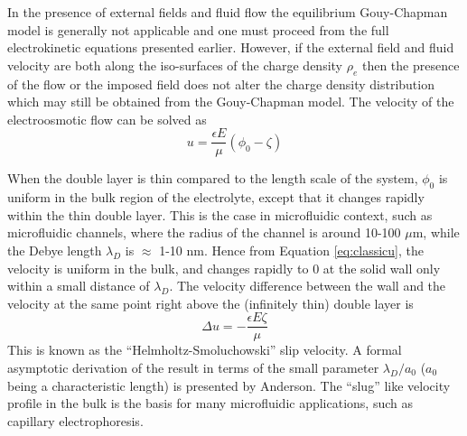 In the presence of external fields and fluid flow the equilibrium Gouy-Chapman model is generally not applicable and one must proceed from the full electrokinetic equations presented earlier. However, if the external field and fluid velocity are both along the iso-surfaces of the charge density $\rho_e$ then the presence of the flow or the imposed field does not alter the charge density distribution which may still be obtained from the Gouy-Chapman model. The velocity of the electroosmotic flow can be solved as
\begin{equation}
u = \frac{\epsilon E}{\mu}\left(\phi_0 - \zeta\right)
\label{eq:classicu}
\end{equation}

When the double layer is thin compared to the length scale of the system, $\phi_0$ is uniform in the bulk region of the electrolyte, except that it changes rapidly within the thin double layer. This is the case in microfluidic context, such as microfluidic channels, where the radius of the channel is around 10-100 $\mu$m, while the Debye length $\lambda_D$ is $\approx$ 1-10 nm. Hence from Equation \ref{eq:classicu}, the velocity is uniform in the bulk, and changes rapidly to 0 at the solid wall only within a small distance of $\lambda_D$. The velocity difference between the wall and the velocity at the same point right above the (infinitely thin) double layer is
\begin{equation}
\Delta u = -\frac{\epsilon E \zeta}{\mu}
\label{eq:HSslip}
\end{equation}
This is known as the ``Helmholtz-Smoluchowski'' slip velocity\cite{Helmholtz,Smoluchowski1924}. A formal asymptotic derivation of the result in terms of the small parameter $\lambda_D/a_0$ ($a_0$ being a characteristic length) is presented by Anderson\cite{anderson1985effect}. The ``slug'' like velocity profile in the bulk is the basis for many microfluidic applications, such as capillary electrophoresis\cite{ghosal2006electrokinetic}.~

